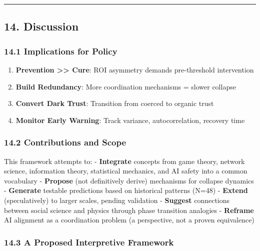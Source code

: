\documentclass[11pt,letterpaper]{article}
\providecommand{\tightlist}{%
  \setlength{\itemsep}{0pt}\setlength{\parskip}{0pt}}
\begin{document}
\begin{center}\rule{0.5\linewidth}{0.5pt}\end{center}

\subsection{14. Discussion}\label{discussion}

\subsubsection{14.1 Implications for
Policy}\label{implications-for-policy}

\begin{enumerate}
\def\labelenumi{\arabic{enumi}.}
\tightlist
\item
  \textbf{Prevention \textgreater\textgreater{} Cure}: ROI asymmetry
  demands pre-threshold intervention
\item
  \textbf{Build Redundancy}: More coordination mechanisms = slower
  collapse
\item
  \textbf{Convert Dark Trust}: Transition from coerced to organic trust
\item
  \textbf{Monitor Early Warning}: Track variance, autocorrelation,
  recovery time
\end{enumerate}

\subsubsection{14.2 Contributions and
Scope}\label{contributions-and-scope}

This framework attempts to: - \textbf{Integrate} concepts from game
theory, network science, information theory, statistical mechanics, and
AI safety into a common vocabulary - \textbf{Propose} (not definitively
derive) mechanisms for collapse dynamics - \textbf{Generate} testable
predictions based on historical patterns (N=48) - \textbf{Extend}
(speculatively) to larger scales, pending validation - \textbf{Suggest}
connections between social science and physics through phase transition
analogies - \textbf{Reframe} AI alignment as a coordination problem (a
perspective, not a proven equivalence)

\subsubsection{14.3 A Proposed Interpretive
Framework}\label{a-proposed-interpretive-framework}
\end{document}
